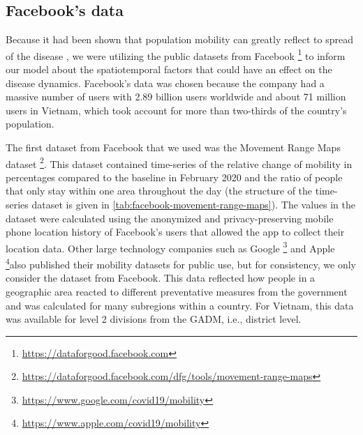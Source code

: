 \subsection{Facebook's data}
\label{sec:methodologies-data-mobility-data}

Because it had been shown that population mobility can greatly reflect to spread of the disease \cite{changMobilityNetworkModels2021,liSubstantialUndocumentedInfection2020,ihmecovid-19forecastingteamModelingCOVID19Scenarios2021}, we were utilizing the public datasets from Facebook \footnote{\url{https://dataforgood.facebook.com}} to inform our model about the spatiotemporal factors that could have an effect on the disease dynamics.
Facebook's data was chosen because the company had a massive number of users with 2.89 billion users worldwide and about 71 million users in Vietnam, which took account for more than two-thirds of the country's population.

The first dataset from Facebook that we used was the Movement Range Maps dataset \footnote{\url{https://dataforgood.facebook.com/dfg/tools/movement-range-maps}}.
This dataset contained time-series of the relative change of mobility in percentages compared to the baseline in February 2020 and the ratio of people that only stay within one area throughout the day \cite{ProtectingPrivacyFacebook2020} (the structure of the time-series dataset is given in \autoref{tab:facebook-movement-range-maps}).
The values in the dataset were calculated using the anonymized and privacy-preserving mobile phone location history of Facebook's users that allowed the app to collect their location data.
Other large technology companies such as Google \footnote{\url{https://www.google.com/covid19/mobility}} and Apple \footnote{\url{https://www.apple.com/covid19/mobility} }also published their mobility datasets for public use, but for consistency, we only consider the dataset from Facebook.
This data reflected how people in a geographic area reacted to different preventative measures from the government and was calculated for many subregions within a country.
For Vietnam, this data was available for level 2 divisions from the \gls{GADM}, i.e., district level.

